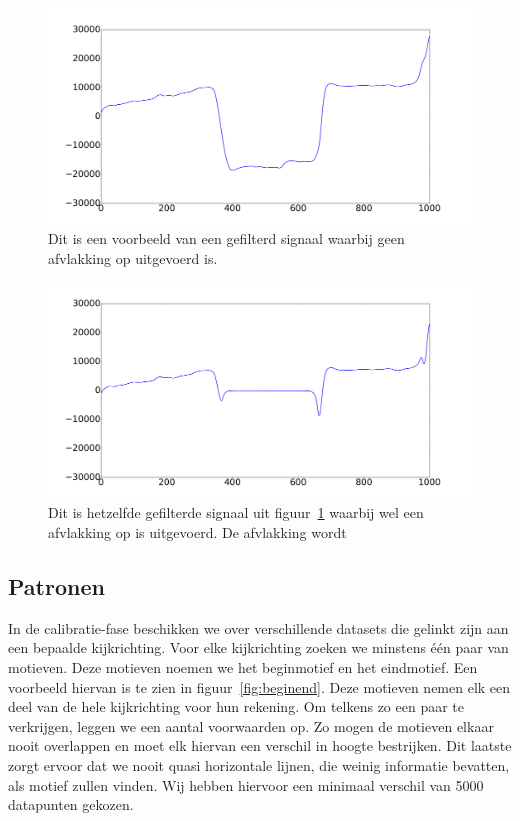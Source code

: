 \documentclass{article}
\begin{document}
\begin{figure}[h]
\centering
\includegraphics[width=\linewidth]{images/afvlakking_original}
\caption{Dit is een voorbeeld van een gefilterd signaal waarbij geen afvlakking op uitgevoerd is.}
\label{fig:afvlakking_original}
\end{figure}

\begin{figure}[h]
\centering
\includegraphics[width=\linewidth]{images/afvlakking}
\caption{Dit is hetzelfde gefilterde signaal uit figuur~\ref{fig:afvlakking_original} waarbij wel een afvlakking op is uitgevoerd. De afvlakking wordt }
\label{fig:afvlakking}
\end{figure}

\subsection{Patronen}

In de calibratie-fase beschikken we over verschillende datasets die gelinkt zijn aan een bepaalde kijkrichting. Voor elke kijkrichting zoeken we minstens één paar van motieven. Deze motieven noemen we het beginmotief en het eindmotief. Een voorbeeld hiervan is te zien in figuur~\ref{fig:beginend}. Deze motieven nemen elk een deel van de hele kijkrichting voor hun rekening. Om telkens zo een paar te verkrijgen, leggen we een aantal voorwaarden op. Zo mogen de motieven elkaar nooit overlappen en moet elk hiervan een verschil in hoogte bestrijken. Dit laatste zorgt ervoor dat we nooit quasi horizontale lijnen, die weinig informatie bevatten, als motief zullen vinden. Wij hebben hiervoor een minimaal verschil van 5000 datapunten gekozen.
\end{document}
